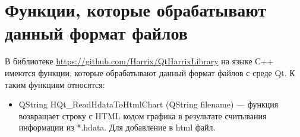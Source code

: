 \documentclass[a4paper,12pt]{article}
\begin{document}
\section{Функции, которые обрабатывают данный формат файлов}

В библиотеке \href {https://github.com/Harrix/QtHarrixLibrary} {https://github.com/Harrix/QtHarrixLibrary} на языке С++ имеются функции, которые обрабатывают данный формат файлов с среде Qt. К таким функциям относятся:

\begin{itemize}
\item QString HQt\_ReadHdataToHtmlChart (QString filename) --- функция возвращает строку с HTML кодом графика в результате считывания информации из *.hdata. Для добавление в html файл.
\end{itemize}
\end{document}
